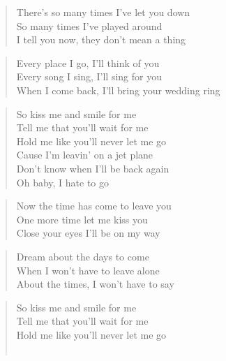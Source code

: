 \documentclass[9pt,a4paper,oneside, onecolumn]{article}
\begin{document}
\begin{verse}
There's so many times I've let you down\\
So many times I've played around\\
I tell you now, they don't mean a thing\\
\end{verse}
\begin{verse}
Every place I go, I'll think of you\\
Every song I sing, I'll sing for you\\
When I come back, I'll bring your wedding ring\\
\end{verse}

\begin{verse}
\qquad So kiss me and smile for me\\
\qquad Tell me that you'll wait for me\\
\qquad Hold me like you'll never let me go\\
\qquad Cause I'm leavin' on a jet plane\\
\qquad Don't know when I'll be back again\\
\qquad Oh baby, I hate to go\\
\end{verse}

\begin{verse}
Now the time has come to leave you\\
One more time let me kiss you\\
Close your eyes I'll be on my way\\
\end{verse}
\begin{verse}
Dream about the days to come\\
When I won't have to leave alone\\
About the times, I won't have to say\\
\end{verse}

\begin{verse}
\qquad So kiss me and smile for me\\
\qquad Tell me that you'll wait for me\\
\qquad Hold me like you'll never let me go\\
\qquad {}\\
\end{verse}

\end{document}
